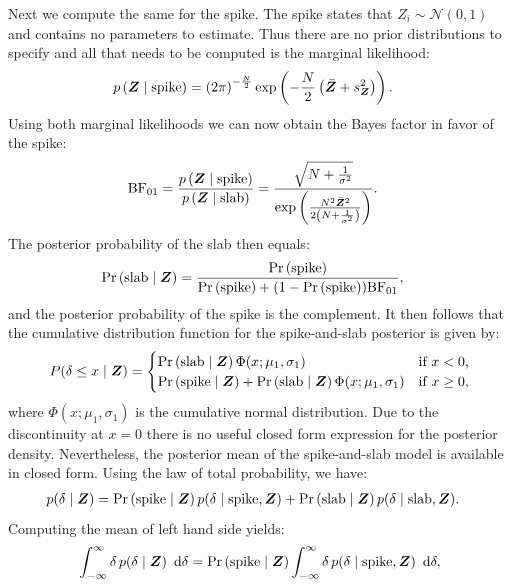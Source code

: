 \documentclass[a4paper]{article}
\newcommand{\shypo}[1]{%
	\ifnum#1>0%
		\mathrm{slab}
	\else%
		\mathrm{spike}
	\fi%
}
\newcommand{\dataZ}	{\bm{Z}}
\newcommand{\dataZi}{Z_i}
\newcommand{\meanZ}	{\bar{\dataZ}}
\newcommand{\varZ}	{s_{\dataZ}^2}
\newcommand{\probp}[1]{p\left(#1\right)}
\newcommand{\probo}{\mathrm{Pr}}
\newcommand{\prob}[1]{\probo\left(#1\right)}
\newcommand{\dnorm}[2]{\mathcal{N}\left(#1, #2\right)}
\newcommand{\dx}[1]{\enspace\mathrm{d}{#1}}
\newenvironment{revision}{\color{teal}}{\color{black}}
\begin{document}
\begin{revision}
Next we compute the same for the spike. The spike states that $\dataZi\sim \dnorm{0}{1}$ and contains no parameters to estimate. Thus there are no prior distributions to specify and all that needs to be computed is the marginal likelihood:
\begin{align*}
	\probp{\dataZ\mid\shypo{0}} &= 
	\left(2\pi\right)^{-\frac{N}{2}}
	\exp\left(-\frac{N}{2}\left(\meanZ + \varZ\right)\right).
\end{align*}
Using both marginal likelihoods we can now obtain the Bayes factor in favor of the spike:
\begin{align*}
	\text{BF}_{01} &= \frac{\probp{\dataZ\mid\shypo{0}}}{\probp{\dataZ\mid\shypo{1}}} =
	\frac{
		\sqrt{N+\frac{1}{\sigma^2}}
	}{
		\exp\left(\frac{N^2 \meanZ^2}{2\left(N+\frac{1}{\sigma^2}\right)}\right)		
	}.
\end{align*}
The posterior probability of the slab then equals:
\begin{align*}
	\prob{\shypo{1}\mid \dataZ} &= \frac{\prob{\shypo{0}}}{\prob{\shypo{0}} + (1 - \prob{\shypo{0}})\text{BF}_{01}},
\end{align*}
and the posterior probability of the spike is the complement. It then follows that the cumulative distribution function for the spike-and-slab posterior is given by:
\begin{align*}
	P(\delta\leq x \mid \dataZ) =
	\begin{cases}
	\prob{\shypo{1}\mid \dataZ}\Phi(x;\mu_1,\sigma_1)	 							& \text{if $x < 0$,} \\
	\prob{\shypo{0}\mid \dataZ} + \prob{\shypo{1}\mid \dataZ}\Phi(x;\mu_1,\sigma_1)	& \text{if $x \geq 0$,}\\
	\end{cases}
\end{align*}
where $\Phi(x;\mu_1,\sigma_1)$ is the cumulative normal distribution. Due to the discontinuity at $x = 0$ there is no useful closed form expression for the posterior density. Nevertheless, the posterior mean of the spike-and-slab model is available in closed form. Using the law of total probability, we have: 
\begin{align*}
	p(\delta\mid \dataZ) &= \prob{\shypo{0}\mid \dataZ}p(\delta\mid\shypo{0}, \dataZ) + \prob{\shypo{1}\mid \dataZ}p(\delta\mid\shypo{1}, \dataZ).
\end{align*}
Computing the mean of left hand side yields:
\begin{align*}
	\int_{-\infty}^\infty \delta \, p(\delta\mid \dataZ) \dx{\delta} &= 
	\prob{\shypo{0}\mid \dataZ}\int_{-\infty}^\infty\delta \, p(\delta\mid\shypo{0}, \dataZ) \dx{\delta}, \\

\end{align*}
\end{revision}
\end{document}
